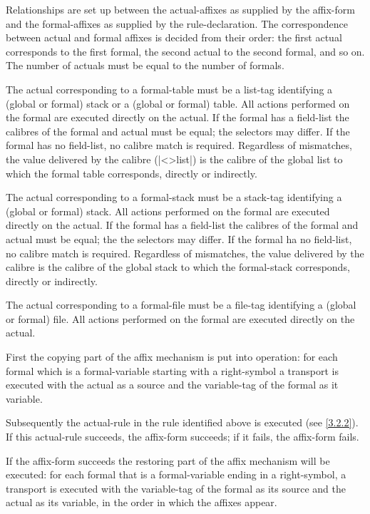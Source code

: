\documentclass{article}
\newcommand\g[1]{{\sf #1}}
\begin{document}
\smallskip
Relationships are set up between the \g{actual-affix}es as supplied by the
\g{affix-form} and the \g{formal-affix}es as supplied by the \g{rule-declaration}.
The correspondence between actual and formal affixes is decided
from their order: the first actual corresponds to the first formal, the
second actual to the second formal, and so on. The number of actuals must be
equal to the number of formals.

The \g{actual} corresponding to a \g{formal-table} must be a \g{list-tag}
identifying a (global or formal) stack or a (global or formal) table. All actions
performed on the \g{formal} are executed directly on the \g{actual}. If the
\g{formal} has a \g{field-list} the calibres
of the \g{formal} and
\g{actual} must be equal; the selectors may differ. If the \g{formal}
has no \g{field-list}, no calibre
match is required. Regardless of
mismatches, the value delivered by the \g{calibre} (\pp|<>list|) is the
calibre of the global list to which the \g{formal table}
corresponds, directly or indirectly.

The \g{actual} corresponding to a \g{formal-stack} must be a \g{stack-tag}
identifying
a (global or formal) stack. All actions performed on the \g{formal} are
executed directly on the \g{actual}. If the \g{formal} has a \g{field-list}
the calibres of the
\g{formal} and \g{actual} must be equal; the
the selectors may differ. If the \g{formal} ha no \g{field-list}, no
calibre match is required. Regardless of mismatches, the value delivered by the
\g{calibre} is the calibre of the global stack to which the
\g{formal-stack} corresponds, directly or indirectly.

The \g{actual} corresponding to a \g{formal-file} must be a \g{file-tag}
identifying
a (global or formal) file. All actions performed on the \g{formal} are
executed directly on the \g{actual}.

\smallskip

First the copying part of the affix mechanism is put into operation: for
each \g{formal} which is a \g{formal-variable} starting with a 
\g{right-symbol} a \g{transport} is executed with the \g{actual} as a \g{source} and
the \g{variable-tag} of the \g{formal} as it \g{variable}.

Subsequently the \g{actual-rule} in the rule identified above is executed
(see \ref{3.2.2}). If this \g{actual-rule} succeeds, the \g{affix-form}
succeeds; if it fails, the \g{affix-form} fails.

If the \g{affix-form} succeeds the restoring part of the affix mechanism
will be executed: for each \g{formal} that is a \g{formal-variable} ending
in a \g{right-symbol}, a \g{transport} is executed with the \g{variable-tag}
of the \g{formal} as its
\g{source} and the \g{actual} as its \g{variable}, in the order in which
the affixes appear.
\end{document}
